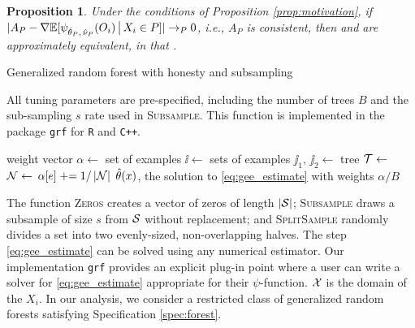 \documentclass[aos]{imsart}
\theoremstyle{plain}
\newtheorem{prop}{Proposition}
\theoremstyle{definition}
\theoremstyle{remark}
\begin{document}
\begin{CJK}{UTF8}{gbsn}
\begin{prop}
\label{prop:approximation}
Under the conditions of Proposition \ref{prop:motivation}, if 
$|A_P - \nabla \mathbb{E}[\psi_{\hat{\theta}_P, \, \hat{\nu}_P}(O_i) \,\big|\, X_i \in P]| \rightarrow_P 0$,
i.e., $A_P$ is consistent,
then  and  are approximately equivalent, in that
.
\end{prop}

\newcommand{\pluseq}{\mathrel{+}=}

\begin{algorithm}[t]
\caption{Generalized random forest with honesty and subsampling}\label{alg:forest}
\vspace{-0.4\baselineskip}
\justify
All tuning parameters are pre-specified, including the number of trees $B$ and the sub-sampling $s$ rate used in
\textsc{Subsample}. This function is implemented in the package \texttt{grf}
for \texttt{R} and \texttt{C++}.
\begin{algorithmic}[1]
\State weight vector $\alpha \gets$ 
\State set of examples $\ii \gets$ 
\State sets of examples $\jj_1, \, \jj_2 \gets$ 
\State tree $\mathcal{T} \gets$ 
\State $\mathcal{N} \gets $ 
\State $\alpha[{e}] \pluseq 1/\abs{\nn}$
\EndFor
\EndFor
{} $\hat{\theta}(x)$, the solution to \eqref{eq:gee_estimate} with weights $\alpha/B$
\EndProcedure
\end{algorithmic}
\justify
The function \textsc{Zeros} creates a vector of zeros of length $\left\lvert\mathcal{S}\right\rvert$;
\textsc{Subsample} draws a subsample of size $s$ from $\mathcal{S}$ without replacement; and
\textsc{SplitSample} randomly divides a set into two evenly-sized, non-overlapping halves.
The step \eqref{eq:gee_estimate} can be solved using any numerical estimator.
Our implementation \texttt{grf} provides an explicit plug-in point where a user can write
a solver for \eqref{eq:gee_estimate} appropriate for their $\psi$-function.
$\mathcal{X}$ is the domain of the $X_i$.
In our analysis, we consider a restricted class of generalized random forests satisfying
Specification \ref{spec:forest}.
\end{algorithm}



\end{CJK}
\end{document}
